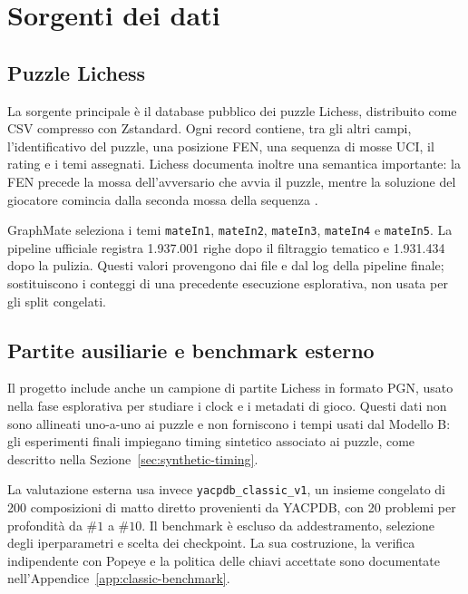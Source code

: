 \label{chap:data}

\section{Sorgenti dei dati}

\subsection{Puzzle Lichess}

La sorgente principale è il database pubblico dei puzzle Lichess, distribuito come
CSV compresso con Zstandard. Ogni record contiene, tra gli altri campi,
l'identificativo del puzzle, una posizione FEN, una sequenza di mosse UCI, il rating
e i temi assegnati. Lichess documenta inoltre una semantica importante: la FEN
precede la mossa dell'avversario che avvia il puzzle, mentre la soluzione del
giocatore comincia dalla seconda mossa della sequenza
\cite{lichessOpenDatabase}.

GraphMate seleziona i temi \texttt{mateIn1}, \texttt{mateIn2},
\texttt{mateIn3}, \texttt{mateIn4} e \texttt{mateIn5}. La pipeline ufficiale
registra 1.937.001 righe dopo il filtraggio tematico e 1.931.434 dopo la pulizia.
Questi valori provengono dai file e dal log della pipeline finale; sostituiscono i
conteggi di una precedente esecuzione esplorativa, non usata per gli split
congelati.

\subsection{Partite ausiliarie e benchmark esterno}

Il progetto include anche un campione di partite Lichess in formato PGN, usato
nella fase esplorativa per studiare i clock e i metadati di gioco. Questi dati non
sono allineati uno-a-uno ai puzzle e non forniscono i tempi usati dal Modello B:
gli esperimenti finali impiegano timing sintetico associato ai puzzle, come
descritto nella Sezione~\ref{sec:synthetic-timing}.

La valutazione esterna usa invece \texttt{yacpdb\_classic\_v1}, un insieme
congelato di 200 composizioni di matto diretto provenienti da YACPDB, con 20
problemi per profondità da \(\#1\) a \(\#10\). Il benchmark è escluso da
addestramento, selezione degli iperparametri e scelta dei checkpoint. La sua
costruzione, la verifica indipendente con Popeye e la politica delle chiavi
accettate sono documentate nell'Appendice~\ref{app:classic-benchmark}.

